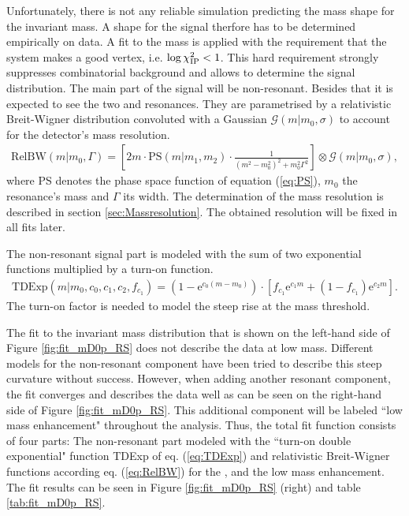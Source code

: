 Unfortunately, there is not any reliable simulation predicting the mass shape for the \Dz\proton invariant mass. 
A shape for the signal therfore has to be determined empirically on data. 
A fit to the \Dz\proton mass is applied with the requirement that the \Dz\proton\muon system makes a good vertex, i.e. $\log \chi^2_{\text{IP}} < 1$. 
This hard requirement strongly suppresses combinatorial background and allows to determine the signal distribution.
The main part of the signal will be non-resonant.
Besides that it is expected to see the two \LcResI and \LcResII resonances.
They are parametrised by a relativistic Breit-Wigner distribution convoluted with a Gaussian $\mathcal{G}(m|m_0,\sigma)$ to account for the detector's mass resolution.
\begin{align}
    \text{RelBW}(m|m_0,\Gamma) = \left[ 2m \cdot \text{PS}(m|m_1,m_2) \cdot \frac{1}{(m^2 -m_0^2)^2 + m_0^2\Gamma^2} \right] \otimes \mathcal{G}(m|m_0,\sigma), \label{eq:RelBW}
\end{align}
where PS denotes the phase space function of equation (\ref{eq:PS}), $m_0$ the resonance's mass and $\Gamma$ its width.
The determination of the mass resolution is described in section \ref{sec:Massresolution}. 
The obtained resolution will be fixed in all fits later.

The non-resonant signal part is modeled with the sum of two exponential functions multiplied by a turn-on function.
\begin{align}
    \text{TDExp}(m|m_0, c_0, c_1, c_2, f_{c_1}) = \left( 1 - \mathrm{e}^{c_0(m-m_0)} \right) \cdot \left[ f_{c_1} \mathrm{e}^{c_1m} + (1-f_{c_1}) \mathrm{e}^{c_2m} \right]. \label{eq:TDExp}
\end{align}
The turn-on factor is needed to model the steep rise at the \Dz\proton mass threshold.

The fit to the invariant \Dz\proton mass distribution that is shown on the left-hand side of Figure \ref{fig:fit_mD0p_RS} does not describe the data at low \Dz\proton mass.
Different models for the non-resonant component have been tried to describe this steep curvature without success.
However, when adding another resonant component, the fit converges and describes the data well as can be seen on the right-hand side of Figure \ref{fig:fit_mD0p_RS}.
This additional component will be labeled ``low mass enhancement" throughout the analysis.
Thus, the total fit function consists of four parts: 
The non-resonant part modeled with the ``turn-on double exponential" function TDExp of eq. (\ref{eq:TDExp}) and relativistic Breit-Wigner functions according eq. (\ref{eq:RelBW}) for the \LcResI, \LcResII and the low mass enhancement. 
The fit results can be seen in Figure \ref{fig:fit_mD0p_RS} (right) and table \ref{tab:fit_mD0p_RS}.

